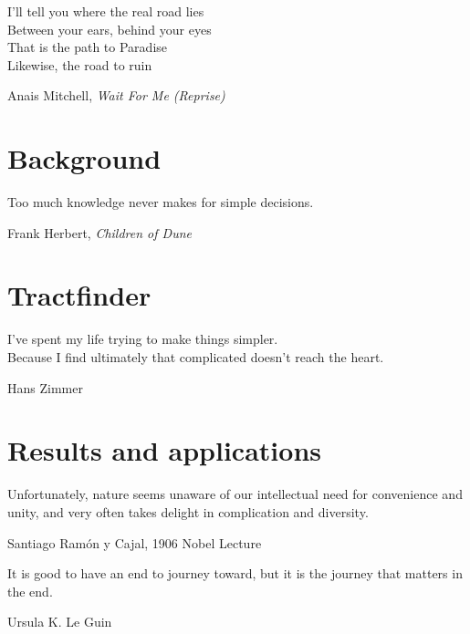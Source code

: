 \documentclass[12pt,phd,a4paper,oneside,draft]{ucl_thesis}
\begin{document}


\ifdraft{%
  \setcounter{tocdepth}{5}
  \tableofcontents}{%
  
  \printglossary[type=\acronymtype]
  \glsaddallunused[main]
  \printglossary
}

\epigraph{I'll tell you where the real road lies\\
Between your ears, behind your eyes\\
That is the path to Paradise\\
Likewise, the road to ruin}{Anais Mitchell, \textit{Wait For Me (Reprise)}}


\part{Background}
\epigraph{Too much knowledge never makes for simple decisions.}{Frank Herbert, \textit{Children of Dune}}





\part{Tractfinder}\label{part2}
\epigraph{I've spent my life trying to make things simpler. \\ Because I find ultimately that complicated doesn't reach the heart.}{Hans Zimmer}








\part{Results and applications}\label{part3}
\epigraph{Unfortunately, nature seems unaware of our intellectual need for convenience and unity, and very often takes delight in complication and diversity.}{Santiago Ramón y Cajal, 1906 Nobel Lecture}





\epigraph{It is good to have an end to journey toward, but it is the journey that matters in the end.}{Ursula K. Le Guin}


% 

\printbibliography

\end{document}
